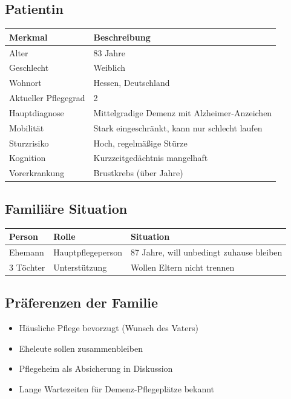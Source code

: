 \documentclass[11pt,a4paper]{article}
\newcommand{\cmark}{\ding{51}}
\begin{document}
\subsection{Patientin}

\begin{center}
\begin{tabular}{ll}
\toprule
\textbf{Merkmal} & \textbf{Beschreibung} \\
\midrule
Alter & 83 Jahre \\
Geschlecht & Weiblich \\
Wohnort & Hessen, Deutschland \\
Aktueller Pflegegrad & 2 \\
Hauptdiagnose & Mittelgradige Demenz mit Alzheimer-Anzeichen \\
Mobilität & Stark eingeschränkt, kann nur schlecht laufen \\
Sturzrisiko & Hoch, regelmäßige Stürze \\
Kognition & Kurzzeitgedächtnis mangelhaft \\
Vorerkrankung & Brustkrebs (über Jahre) \\
\bottomrule
\end{tabular}
\end{center}

\subsection{Familiäre Situation}

\begin{center}
\begin{tabular}{lll}
\toprule
\textbf{Person} & \textbf{Rolle} & \textbf{Situation} \\
\midrule
Ehemann & Hauptpflegeperson & 87 Jahre, will unbedingt zuhause bleiben \\
3 Töchter & Unterstützung & Wollen Eltern nicht trennen \\
\bottomrule
\end{tabular}
\end{center}

\subsection{Präferenzen der Familie}

\begin{itemize}
    \item[\cmark] Häusliche Pflege bevorzugt (Wunsch des Vaters)
    \item[\cmark] Eheleute sollen zusammenbleiben
    \item[$\triangle$] Pflegeheim als Absicherung in Diskussion
    \item[$\triangle$] Lange Wartezeiten für Demenz-Pflegeplätze bekannt
\end{itemize}
\end{document}
